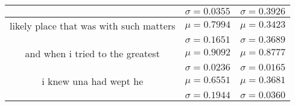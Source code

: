 \begin{table}[tbp]
\begin{center}
\begin{tabular}{ccc}
                                                      & \(\sigma=0.0355\)                                 & \(\sigma=0.3926\)           \\
            \midrule
            likely place that was with such matters   & \(\mu=0.7994\)                                    & \(\mu=0.3423\)              \\
                                                      & \(\sigma=0.1651\)                                 & \(\sigma=0.3689\)           \\
            \midrule
            and when i tried to the greatest          & \(\mu=0.9092\)                                    & \(\mu=0.8777\)              \\
                                                      & \(\sigma=0.0236\)                                 & \(\sigma=0.0165\)           \\
            \midrule
            i knew una had wept  he                   & \(\mu=0.6551\)                                    & \(\mu=0.3681\)              \\
                                                      & \(\sigma=0.1944\)                                 & \(\sigma=0.0360\)           \\
            \bottomrule
        \end{tabular}\label{tab2}
    \end{center}
\end{table}
